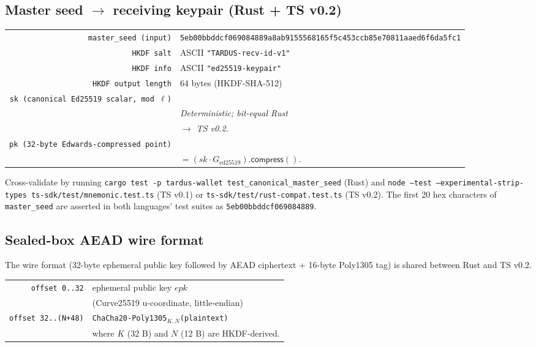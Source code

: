 \subsection{Master seed \texorpdfstring{$\to$}{->} receiving keypair (Rust + TS v0.2)}
\label{sec:vec-recv-keypair}

\begin{center}\small
\begin{tabular}{rl}
\toprule
\texttt{master\_seed (input)} & \texttt{5eb00bbddcf069084889a8ab9155568165f5c453ccb85e70811aaed6f6da5fc1} \\
\texttt{HKDF salt}            & ASCII \texttt{"TARDUS-recv-id-v1"} \\
\texttt{HKDF info}            & ASCII \texttt{"ed25519-keypair"} \\
\texttt{HKDF output length}   & 64 bytes (HKDF-SHA-512) \\
\texttt{sk (canonical Ed25519 scalar, mod $\ell$)} & \\
                              & \multicolumn{1}{l}{\textit{Deterministic; bit-equal Rust} } \\
                              & \multicolumn{1}{l}{\textit{$\to$ TS v0.2.}} \\
\texttt{pk (32-byte Edwards-compressed point)} & \\
                              & \multicolumn{1}{l}{\textit{$= (sk \cdot G_{\mathrm{ed25519}}).\mathsf{compress}()$.}} \\
\bottomrule
\end{tabular}
\end{center}

Cross-validate by running \texttt{cargo test -p tardus-wallet
test\_canonical\_master\_seed} (Rust) and
\texttt{node --test --experimental-strip-types ts-sdk/test/mnemonic.test.ts}
(TS v0.1) or
\texttt{ts-sdk/test/rust-compat.test.ts} (TS v0.2). The first 20
hex characters of \texttt{master\_seed} are asserted in both
languages' test suites as \texttt{5eb00bbddcf069084889}.

\subsection{Sealed-box AEAD wire format}
\label{sec:vec-sealed-box-wire}

The wire format (32-byte ephemeral public key followed by
AEAD ciphertext + 16-byte Poly1305 tag) is shared between Rust
and TS v0.2.

\begin{center}\small
\begin{tabular}{rl}
\toprule
\texttt{offset 0..32}     & ephemeral public key $epk$ \\
                          & (Curve25519 u-coordinate, little-endian) \\
\texttt{offset 32..(N+48)} & \texttt{ChaCha20-Poly1305}$_{K,N}$\texttt{(plaintext)} \\
                          & where $K$ (32 B) and $N$ (12 B) are HKDF-derived. \\
\bottomrule
\end{tabular}
\end{center}

